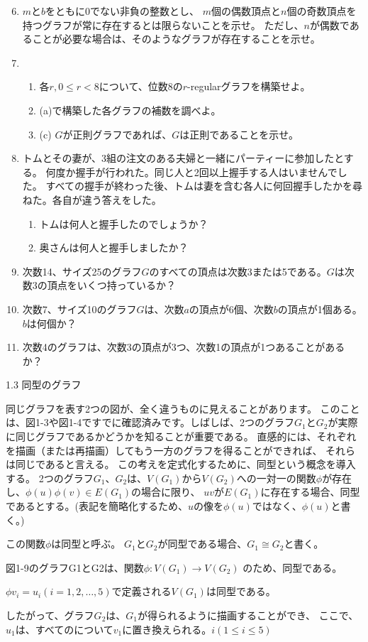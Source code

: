 
\begin{enumerate}
  \setcounter{enumi}{5}
  \item $m$と$b$をともに0でない非負の整数とし、
  $m$個の偶数頂点と$n$個の奇数頂点を持つグラフが常に存在するとは限らないことを示せ。
  ただし、$n$が偶数であることが必要な場合は、そのようなグラフが存在することを示せ。
  \item \begin{enumerate}
    \item 各$r, 0 \leq r < 8$について、位数8の$r$-regularグラフを構築せよ。
    \item (a)で構築した各グラフの補数を調べよ。
    \item (c) $G$が正則グラフであれば、$G$は正則であることを示せ。
  \end{enumerate}
  \item トムとその妻が、3組の注文のある夫婦と一緒にパーティーに参加したとする。
  何度か握手が行われた。同じ人と2回以上握手する人はいませんでした。
   すべての握手が終わった後、トムは妻を含む各人に何回握手したかを尋ねた。各自が違う答えをした。
  \begin{enumerate}
    \item トムは何人と握手したのでしょうか？
    \item 奥さんは何人と握手しましたか？
  \end{enumerate}
  \item 次数14、サイズ25のグラフ$G$のすべての頂点は次数3または5である。$G$は次数3の頂点をいくつ持っているか？
  \item 次数7、サイズ10のグラフ$G$は、次数$a$の頂点が6個、次数$b$の頂点が1個ある。$b$は何個か？
  \item 次数4のグラフは、次数3の頂点が3つ、次数1の頂点が1つあることがあるか？
\end{enumerate}

\begin{description}
  \item[1.3 同型のグラフ] 
\end{description}

同じグラフを表す2つの図が、全く違うものに見えることがあります。
このことは、図1-3や図1-4ですでに確認済みです。しばしば、2つのグラフ$G_1$と$G_2$が実際に同じグラフであるかどうかを知ることが重要である。
直感的には、それぞれを描画（または再描画）してもう一方のグラフを得ることができれば、
それらは同じであると言える。
この考えを定式化するために、同型という概念を導入する。
2つのグラフ$G_1$、$G_2$は、$V(G_1)$から$V(G_2)$への一対一の関数$\phi$が存在し、$\phi(u) \phi(v) \in E(G_1)$の場合に限り、
$uv$が$E(G_1)$に存在する場合、同型であるとする。(表記を簡略化するため、$u$の像を$\phi(u)$ではなく、$\phi(u)$と書く。)


この関数$\phi$は同型と呼ぶ。
$G_1$と$G_2$が同型である場合、$G_1 \cong G_2$と書く。

図1-9のグラフG1とG2は、関数$\phi:V(G_1) \rightarrow V(G_2)$ のため、同型である。

$\phi v_i = u_i (i = 1,2,\ldots,5)$で定義される$V(G_1)$は同型である。

したがって、グラフ$G_2$は、$G_1$が得られるように描画することができ、
ここで、$u_1$は、すべてのについて$v_1$に置き換えられる。$i (1 \leq i \leq 5)$